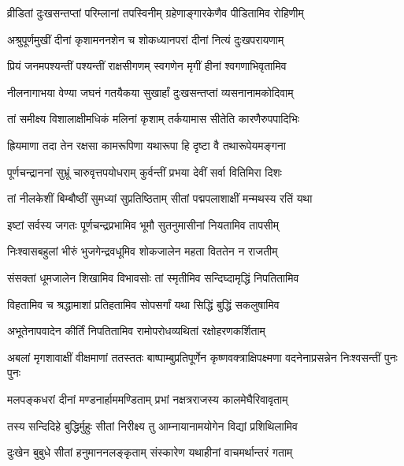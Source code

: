 \twolineshloka
{व्रीडितां दुःखसन्तप्तां परिम्लानां तपस्विनीम्}
{ग्रहेणाङ्गारकेणैव पीडितामिव रोहिणीम्} %

\twolineshloka
{अश्रुपूर्णमुखीं दीनां कृशामननशेन च}
{शोकध्यानपरां दीनां नित्यं दुःखपरायणाम्} %

\twolineshloka
{प्रियं जनमपश्यन्तीं पश्यन्तीं राक्षसीगणम्}
{स्वगणेन मृगीं हीनां श्वगणाभिवृतामिव} %

\twolineshloka
{नीलनागाभया वेण्या जघनं गतयैकया}
{सुखार्हां दुःखसन्तप्तां व्यसनानामकोदिवाम्} %

\twolineshloka
{तां समीक्ष्य विशालाक्षीमधिकं मलिनां कृशाम्}
{तर्कयामास सीतेति कारणैरुपपादिभिः} %

\twolineshloka
{ह्रियमाणा तदा तेन रक्षसा कामरूपिणा}
{यथारूपा हि दृष्टा वै तथारूपेयमङ्गना} %

\twolineshloka
{पूर्णचन्द्राननां सुभ्रूं चारुवृत्तपयोधराम्}
{कुर्वन्तीं प्रभया देवीं सर्वा वितिमिरा दिशः} %

\twolineshloka
{तां नीलकेशीं बिम्बौष्ठीं सुमध्यां सुप्रतिष्ठिताम्}
{सीतां पद्मपलाशाक्षीं मन्मथस्य रतिं यथा} %

\twolineshloka
{इष्टां सर्वस्य जगतः पूर्णचन्द्रप्रभामिव}
{भूमौ सुतनुमासीनां नियतामिव तापसीम्} %

\twolineshloka
{निःश्वासबहुलां भीरुं भुजगेन्द्रवधूमिव}
{शोकजालेन महता विततेन न राजतीम्} %

\twolineshloka
{संसक्तां धूमजालेन शिखामिव विभावसोः}
{तां स्मृतीमिव सन्दिघ्दामृद्धिं निपतितामिव} %

\twolineshloka
{विहतामिव च श्रद्धामाशां प्रतिहतामिव}
{सोपसर्गां यथा सिद्धिं बुद्धिं सकलुषामिव} %

\twolineshloka
{अभूतेनापवादेन कीर्तिं निपतितामिव}
{रामोपरोधव्यथितां रक्षोहरणकर्शिताम्} %

\threelineshloka
{अबलां मृगशावाक्षीं वीक्षमाणां ततस्ततः}
{बाष्पाम्बुप्रतिपूर्णेन कृष्णवक्त्राक्षिपक्ष्मणा}
{वदनेनाप्रसन्नेन निःश्वसन्तीं पुनः पुनः} %

\twolineshloka
{मलपङ्कधरां दीनां मण्डनार्हाममण्डिताम्}
{प्रभां नक्षत्रराजस्य कालमेघैरिवावृताम्} %

\twolineshloka
{तस्य सन्दिदिहे बुद्धिर्मुहुः सीतां निरीक्ष्य तु}
{आम्नायानामयोगेन विद्यां प्रशिथिलामिव} %

\twolineshloka
{दुःखेन बुबुधे सीतां हनुमाननलङ्कृताम्}
{संस्कारेण यथाहीनां वाचमर्थान्तरं गताम्} %

